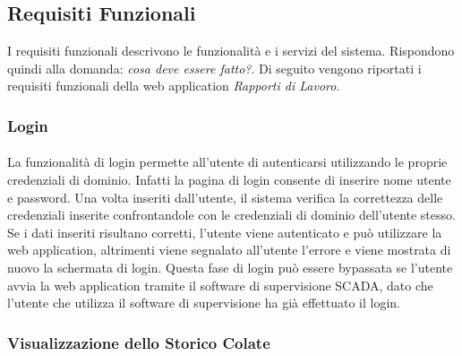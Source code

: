   \subsection{Requisiti Funzionali}
  I requisiti funzionali descrivono le funzionalità e i servizi del sistema. Rispondono quindi alla domanda: 
  \textit{cosa deve essere fatto?}. Di seguito vengono riportati i requisiti funzionali della web application \textit{Rapporti di Lavoro}.
  
  \subsubsection{Login}
  \paragraph{}
  La funzionalità di login permette all’utente di autenticarsi utilizzando le proprie credenziali 
  di dominio. Infatti la pagina di login consente di inserire nome utente e password. Una volta inseriti 
  dall’utente, il sistema verifica la correttezza delle credenziali inserite confrontandole con le 
  credenziali di dominio dell’utente stesso. Se i dati inseriti risultano corretti, l’utente viene 
  autenticato e può utilizzare la web application, altrimenti viene segnalato all’utente l’errore 
  e viene mostrata di nuovo la schermata di login. Questa fase di login può essere bypassata se 
  l’utente avvia la web application tramite il software di supervisione SCADA, dato che l’utente 
  che utilizza il software di supervisione ha già effettuato il login.

  \subsubsection{Visualizzazione dello Storico Colate}

